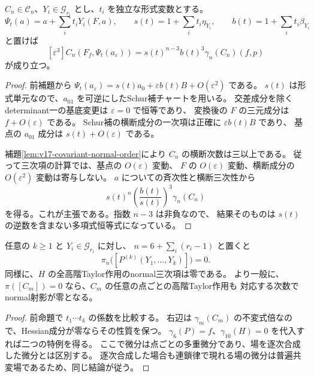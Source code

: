 \begin{proposition}[一つの斉次共変量の変換公式]
\label{prop:v18-homogeneous-normal-pullback}
$C_n\in\mathcal C_n$、$Y_i\in\mathcal G_{r_i}$ とし、$t_i$ を独立な形式変数とする。
\[
 \Psi_t(a)=a+\sum_i t_iY_i(F,a),\qquad
 s(t)=1+\sum_i t_i\eta_{Y_i},\qquad
 b(t)=1+\sum_i t_i\beta_{Y_i}
\]
と置けば
\begin{equation}\label{eq:v18-homogeneous-normal-pullback}
 [\varepsilon^3]C_n(F_f,\Psi_t(a_\varepsilon))
    =s(t)^{n-3}b(t)^3\gamma_n(C_n)(f,p)
\end{equation}
が成り立つ。
\end{proposition}

\begin{proof}
前補題から $\Psi_t(a_\varepsilon)=s(t)a_0+
\varepsilon b(t)B+O(\varepsilon^2)$ である。
$s(t)$ は形式単元なので、$a_{01}$ を可逆にしたSchur補チャートを用いる。
交差成分を除くdeterminant一の基底変更は $\varepsilon=0$ で恒等であり、
変換後の $F$ の三元成分は $f+O(\varepsilon)$ である。
Schur補の横断成分の一次項は正確に $\varepsilon b(t)B$ であり、
基点の $a_{01}$ 成分は $s(t)+O(\varepsilon)$ である。

補題\ref{lem:v17-covariant-normal-order}により $C_n$ の横断次数は三以上である。
従って三次項の計算では、基点の $O(\varepsilon)$ 変動、
$F$ の $O(\varepsilon)$ 変動、横断成分の $O(\varepsilon^2)$ 変動は寄与しない。
$a$ についての斉次性と横断三次性から
\[
 s(t)^n\left(\frac{b(t)}{s(t)}\right)^3\gamma_n(C_n)
\]
を得る。これが主張である。指数 $n-3$ は非負なので、
結果そのものは $s(t)$ の逆数を含まない多項式恒等式になっている。
\end{proof}

\begin{corollary}[全高階Taylor作用のnormal射影]
\label{cor:v18-all-higher-actions-normal-zero}
任意の $k\ge1$ と $Y_i\in\mathcal G_{r_i}$ に対し、
$n=6+\sum_i(r_i-1)$ と置くと
\[
 \pi_n\bigl([P^{(k)}(Y_1,\ldots,Y_k)]\bigr)=0.
\]
同様に、$H$ の全高階Taylor作用のnormal三次項は零である。
より一般に、$\pi([C_m])=0$ なら、$C_m$ の任意の点ごとの高階Taylor作用も
対応する次数でnormal射影が零となる。
\end{corollary}

\begin{proof}
前命題で $t_1\cdots t_k$ の係数を比較する。
右辺は $\gamma_m(C_m)$ の不変式倍なので、Hessian成分が零ならその性質を保つ。
$\gamma_6(P)=f$、$\gamma_{10}(H)=0$ を代入すれば二つの特例を得る。
ここで微分は点ごとの多重微分であり、場を逐次合成した微分とは区別する。
逐次合成した場合も連鎖律で現れる場の微分は普遍共変場であるため、同じ結論が従う。
\end{proof}

